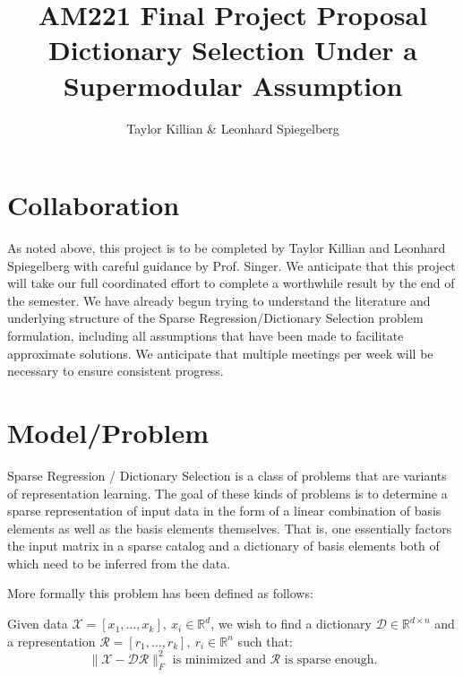 \documentclass{article}
\newcommand{\R}{\mathbb{R}}
\begin{document}
\title{AM221 Final Project Proposal \\ \large Dictionary Selection Under a Supermodular Assumption}
\author{Taylor Killian \& Leonhard Spiegelberg}
\maketitle

%

\section{Collaboration}\label{partnership}
As noted above, this project is to be completed by Taylor Killian and Leonhard Spiegelberg with careful guidance by Prof. Singer. We anticipate that this project will take our full coordinated effort to complete a worthwhile result by the end of the semester. We have already begun trying to understand the literature and underlying structure of the Sparse Regression/Dictionary Selection problem formulation, including all assumptions that have been made to facilitate approximate solutions. We anticipate that multiple meetings per week will be necessary to ensure consistent progress. 

\section{Model/Problem} \label{model}
Sparse Regression / Dictionary Selection is a class of problems that are variants of representation learning. The goal of these kinds of problems is to determine a sparse representation of input data in the form of a linear combination of basis elements as well as the basis elements themselves. That is, one essentially factors the input matrix in a sparse catalog and a dictionary of basis elements both of which need to be inferred from the data.
\newline

\noindent More formally this problem has been defined as follows:
\newline

Given data $\mathcal{X} = [x_1,\dots , x_k], \ x_i\in\R^d$, we wish to find a dictionary $\mathcal{D}\in\R^{d \times n}$ and a representation $\mathcal{R} = [r_1, \dots, r_k], \ r_i\in\R^n$ such that: $$\|\mathcal{X}-\mathcal{D}\mathcal{R}\|_F^2 \text{ is minimized and } \mathcal{R} \text{ is sparse enough.}$$
\end{document}
